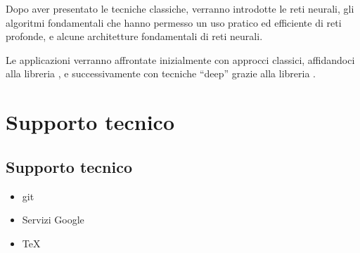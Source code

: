 \documentclass[letterpaper,10pt,english]{jupyterBook}
\begin{document}
\sphinxAtStartPar
Dopo aver presentato le tecniche classiche, verranno introdotte le reti neurali, gli algoritmi fondamentali che hanno permesso un uso pratico ed efficiente di reti profonde, e alcune architetture fondamentali di reti neurali.

\sphinxAtStartPar
Le applicazioni verranno affrontate inizialmente con approcci classici, affidandoci alla libreria , e successivamente con tecniche “deep” grazie alla libreria .

\sphinxstepscope


\part{Supporto tecnico}

\sphinxstepscope


\chapter{Supporto tecnico}
\label{\detokenize{ch/support:supporto-tecnico}}\label{\detokenize{ch/support:programming-hs-support-hs}}\label{\detokenize{ch/support::doc}}\begin{itemize}
\item {} 
\sphinxAtStartPar
git

\item {} 
\sphinxAtStartPar
Servizi Google

\item {} 
\sphinxAtStartPar
TeX

\end{itemize}







\renewcommand{\indexname}{Index}
\printindex
\end{document}
